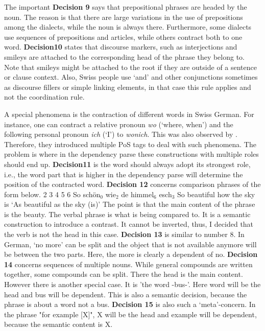 \documentclass[11pt,letterpaper, covington]{article}
\begin{document}
The important \textbf{Decision 9} says that prepositional phrases are headed by the noun. The reason is that there are large variations in the use of prepositions among the dialects, while the noun is always there. Furthermore, some dialects use sequences of prepositions and articles, while others contract both to one word. \textbf{Decision10} states that discourse markers, such as interjections and smileys are attached to the corresponding head of the phrase they belong to. Note that smileys might be attached to the root if they are outside of a sentence or clause context. Also, Swiss people use `and' and other conjunctions sometimes as discourse fillers or simple linking elements, in that case this rule applies and not the coordination rule.

A special phenomena is the contraction of different words in Swiss German. For instance, one can contract a relative pronoun \emph{wo} (`where, when') and the following personal pronoun \emph{ich} (`I') to \emph{wonich}. This  was also observed by \cite{AH12}. Therefore, they introduced multiple PoS tags to deal with such phenomena. The problem is where in the dependency parse these constructions with multiple roles should end up. \textbf{Decision11} is the word should always adopt its strongest role, i.e., the word part that is higher in the dependency parse will determine the position of the contracted word.
\textbf{Decision 12} concerns comparison phrases of the form below.
 2 3 4 5 6
So schön$_0$ wie$_2$ de himmel$_6$ esch$_3$
So beautiful how the sky is
\glt `As beautiful as the sky (is)'
\glend
The point is that the main content of the phrase is the beauty. The verbal phrase is what is being compared to. It is a semantic construction to introduce a contrast. It cannot be inverted, thus, I decided that the verb is not the head in this case.  
\textbf{Decision 13} is similar to number 8. In German, `no more' can be split and the object that is not available anymore will be between the two parts. Here, the more is clearly a dependent of no.
\textbf{Decision 14} concerns sequences of multiple nouns. While general compounds are written together, some compounds can be split. There the head is the main content. However there is another special case. It is 'the word -bus-'. Here word will be the head and bus will be dependent. This is also a semantic decision, because the phrase is about a word not a bus.
\textbf{Decision 15} is also such a `meta'-concern. In the phrase "for example [X]", X will be the head and example will be dependent, because the semantic content is X.  
\end{document}
